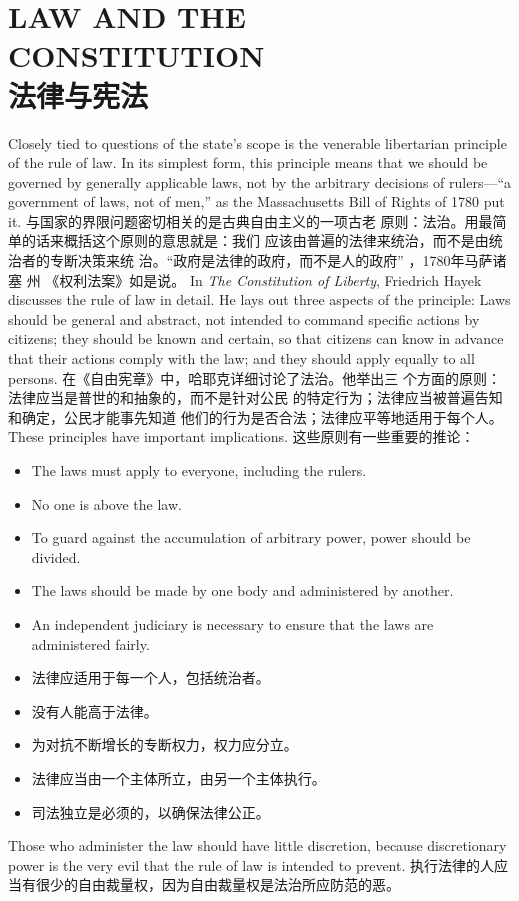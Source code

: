 \chapter{LAW AND THE CONSTITUTION\\法律与宪法}
\begin{paracol}{2}

Closely tied to questions of the state's scope is the venerable libertarian principle of the rule of law. In its simplest
form, this principle means that we should be governed by generally applicable laws, not by the arbitrary decisions of rulers---``a government of laws, not of men,'' as the Massachusetts Bill
of Rights of 1780 put it.
\switchcolumn
与国家的界限问题密切相关的是古典自由主义的一项古老
原则：法治。用最简单的话来概括这个原则的意思就是：我们
应该由普遍的法律来统治，而不是由统治者的专断决策来统
治。“政府是法律的政府，而不是人的政府” ，1780年马萨诸
塞 州 《权利法案》如是说。
\switchcolumn*
In \textit{The Constitution of Liberty}, Friedrich Hayek discusses the
rule of law in detail. He lays out three aspects of the principle:
Laws should be general and abstract, not intended to
command specific actions by citizens; they should be known
and certain, so that citizens can know in advance that their actions comply with the law; and they should apply equally to
all persons.
\switchcolumn
在《自由宪章》中，哈耶克详细讨论了法治。他举出三
个方面的原则：法律应当是普世的和抽象的，而不是针对公民
的特定行为；法律应当被普遍告知和确定，公民才能事先知道
他们的行为是否合法；法律应平等地适用于每个人。
\switchcolumn*
These principles have important implications.
\switchcolumn
这些原则有一些重要的推论：
\switchcolumn*
\begin{itemize}
	\item The laws must apply to everyone, including the rulers.
	\item No one is above the law.
	\item To guard against the accumulation of arbitrary power, power should be divided.
	\item The laws should be made by one body and administered by another.
	\item An independent judiciary is necessary to ensure that the laws are administered fairly.
\end{itemize}
\switchcolumn
\begin{itemize}
	\item 法律应适用于每一个人，包括统治者。
	\item 没有人能高于法律。
	\item 为对抗不断增长的专断权力，权力应分立。
	\item 法律应当由一个主体所立，由另一个主体执行。
	\item 司法独立是必须的，以确保法律公正。
\end{itemize}
\switchcolumn*
Those who administer the law should have little discretion,
because discretionary power is the very evil that the rule of
law is intended to prevent.
\switchcolumn
执行法律的人应当有很少的自由裁量权，因为自由裁量权是法治所应防范的恶。


\end{paracol}
